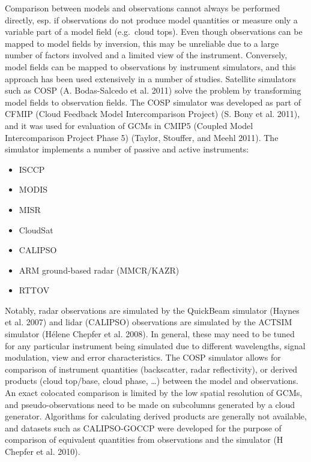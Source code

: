 Comparison between models and observations cannot always be performed
directly, esp. if observations do not produce model quantities or
measure only a variable part of a model field (e.g.~cloud tops). Even
though observations can be mapped to model fields by inversion, this may
be unreliable due to a large number of factors involved and a limited
view of the instrument. Conversely, model fields can be mapped to
observations by instrument simulators, and this approach has been used
extensively in a number of studies. Satellite simulators such as COSP
(A. Bodas-Salcedo et al. 2011) solve the problem by transforming model
fields to observation fields. The COSP simulator was developed as part
of CFMIP (Cloud Feedback Model Intercomparison Project) (S. Bony et al.
2011), and it was used for evaluation of GCMs in CMIP5 (Coupled Model
Intercomparison Project Phase 5) (Taylor, Stouffer, and Meehl 2011). The
simulator implements a number of passive and active instruments:

\begin{itemize}
\itemsep1pt\parskip0pt
\item
  ISCCP
\item
  MODIS
\item
  MISR
\item
  CloudSat
\item
  CALIPSO
\item
  ARM ground-based radar (MMCR/KAZR)
\item
  RTTOV
\end{itemize}

Notably, radar observations are simulated by the QuickBeam simulator
(Haynes et al. 2007) and lidar (CALIPSO) observations are simulated by
the ACTSIM simulator (H{é}lene Chepfer et al. 2008). In general, these
may need to be tuned for any particular instrument being simulated due
to different wavelengths, signal modulation, view and error
characteristics. The COSP simulator allows for comparison of instrument
quantities (backscatter, radar reflectivity), or derived products (cloud
top/base, cloud phase, \ldots{}) between the model and observations. An
exact colocated comparison is limited by the low spatial resolution of
GCMs, and pseudo-observations need to be made on subcolumns generated by
a cloud generator. Algorithms for calculating derived products are
generally not available, and datasets such as CALIPSO-GOCCP were
developed for the purpose of comparison of equivalent quantities from
observations and the simulator (H Chepfer et al. 2010).

